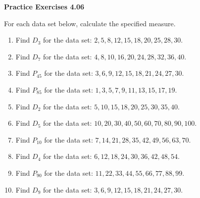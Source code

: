 \vspace{0.3ex}
\noindent\textbf{Practice Exercises 4.06}

\vspace{0.2ex}

For each data set below, calculate the specified measure.  

\begin{enumerate}
    \item Find \(D_3\) for the data set: \(2, 5, 8, 12, 15, 18, 20, 25, 28, 30\).  
    \item Find \(D_7\) for the data set: \(4, 8, 10, 16, 20, 24, 28, 32, 36, 40\).  
    \item Find \(P_{45}\) for the data set: \(3, 6, 9, 12, 15, 18, 21, 24, 27, 30\).  
    \item Find \(P_{85}\) for the data set: \(1, 3, 5, 7, 9, 11, 13, 15, 17, 19\).  
    \item Find \(D_{2}\) for the data set: \(5, 10, 15, 18, 20, 25, 30, 35, 40\).  
    \item Find \(D_5\) for the data set: \(10, 20, 30, 40, 50, 60, 70, 80, 90, 100\).  
    \item Find \(P_{10}\) for the data set: \(7, 14, 21, 28, 35, 42, 49, 56, 63, 70\).  
    \item Find \(D_{4}\) for the data set: \(6, 12, 18, 24, 30, 36, 42, 48, 54\).  
    \item Find \(P_{90}\) for the data set: \(11, 22, 33, 44, 55, 66, 77, 88, 99\).  
   \item Find \(D_9\) for the data set: \(3, 6, 9, 12, 15, 18, 21, 24, 27, 30\).  
\end{enumerate}
